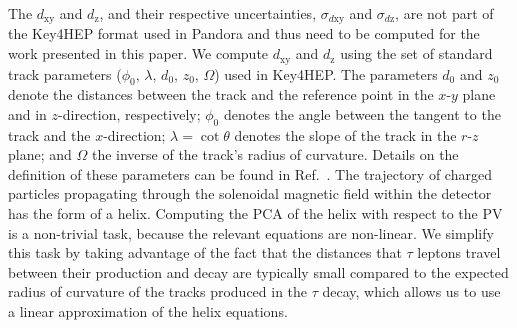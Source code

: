 \documentclass[a4paper,english,11pt]{article}
\newcommand{\Pgt}{\ensuremath{\tau}\xspace}
\newcommand{\dxy}{\ensuremath{d_{\textrm{xy}}}\xspace}
\newcommand{\sigmaxy}{\ensuremath{\sigma_{d{\textrm{xy}}}}\xspace}
\newcommand{\dz}{\ensuremath{d_{\textrm{z}}}\xspace}
\newcommand{\sigmaz}{\ensuremath{\sigma_{d{\textrm{z}}}}\xspace}
\begin{document}
	The $\dxy$ and $\dz$, and their respective uncertainties, $\sigmaxy$ and $\sigmaz$, are not part of the Key4HEP format used in Pandora and thus need to be computed for the work presented in this paper.
	We compute $\dxy$ and $\dz$ using the set of standard track parameters ($\phi_{0},\,\lambda,\,d_{0},\,z_{0},\,\Omega$) used in Key4HEP.
	The parameters $d_{0}$ and $z_{0}$ denote the distances between the track and the reference point in the $x$-$y$ plane and in $z$-direction, respectively; $\phi_{0}$ denotes the angle between the tangent to the track and the $x$-direction; 
	$\lambda= \cot\theta$ denotes the slope of the track in the $r$-$z$ plane; and $\Omega$ the inverse of the track's radius of curvature. Details on the definition of these parameters can be found in Ref.~\cite{Kramer:2006zz}. The trajectory of charged particles propagating through the solenoidal magnetic field within the detector has the form of a helix. Computing the PCA of the helix with respect to the PV is a non-trivial task, because the relevant equations are non-linear.
	We simplify this task by taking advantage of the fact that the distances that $\Pgt$ leptons travel between their production and decay are typically small compared to the expected radius of curvature of the tracks produced in the $\Pgt$ decay, which allows us to use a linear approximation of the helix equations.
	
\end{document}
